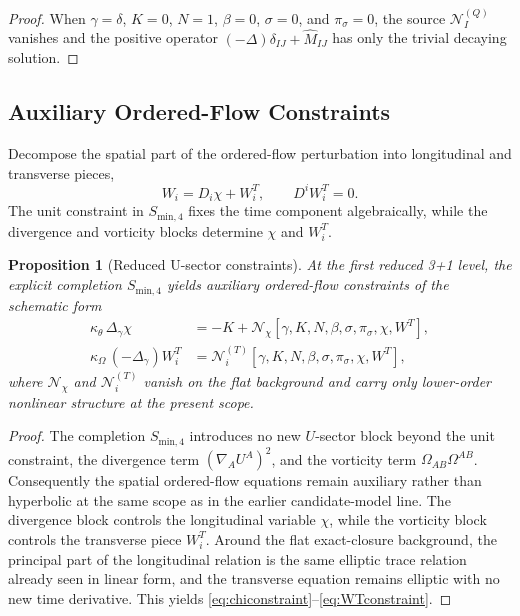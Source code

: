 \documentclass[11pt]{article}
\newtheorem{proposition}{Proposition}
\begin{document}
\begin{proof}
When \(\gamma=\delta\), \(K=0\), \(N=1\), \(\beta=0\), \(\sigma=0\), and \(\pi_\sigma=0\), the source \(\mathcal N_I^{(Q)}\) vanishes and the positive operator \((-\Delta)\delta_{IJ}+\widehat M_{IJ}\) has only the trivial decaying solution.
\end{proof}

\subsection{Auxiliary Ordered-Flow Constraints}

Decompose the spatial part of the ordered-flow perturbation into longitudinal and transverse pieces,
\begin{equation}
W_i=D_i\chi+W_i^T,
\qquad
D^iW_i^T=0.
\label{eq:Wdecomp}
\end{equation}
The unit constraint in \(S_{\mathrm{min},4}\) fixes the time component algebraically, while the divergence and vorticity blocks determine \(\chi\) and \(W_i^T\).

\begin{proposition}[Reduced U-sector constraints]
At the first reduced 3+1 level, the explicit completion \(S_{\mathrm{min},4}\) yields auxiliary ordered-flow constraints of the schematic form
\begin{align}
\kappa_\theta\,\Delta_\gamma \chi
&=
-K + \mathcal N_\chi[\gamma,K,N,\beta,\sigma,\pi_\sigma,\chi,W^T],
\label{eq:chiconstraint}
\\
\kappa_\Omega\,(-\Delta_\gamma)W_i^T
&=
\mathcal N_i^{(T)}[\gamma,K,N,\beta,\sigma,\pi_\sigma,\chi,W^T],
\label{eq:WTconstraint}
\end{align}
where \(\mathcal N_\chi\) and \(\mathcal N_i^{(T)}\) vanish on the flat background and carry only lower-order nonlinear structure at the present scope.
\end{proposition}

\begin{proof}
The completion \(S_{\mathrm{min},4}\) introduces no new \(U\)-sector block beyond the unit constraint, the divergence term \((\nabla_AU^A)^2\), and the vorticity term \(\Omega_{AB}\Omega^{AB}\). Consequently the spatial ordered-flow equations remain auxiliary rather than hyperbolic at the same scope as in the earlier candidate-model line. The divergence block controls the longitudinal variable \(\chi\), while the vorticity block controls the transverse piece \(W_i^T\). Around the flat exact-closure background, the principal part of the longitudinal relation is the same elliptic trace relation already seen in linear form, and the transverse equation remains elliptic with no new time derivative. This yields \eqref{eq:chiconstraint}--\eqref{eq:WTconstraint}.
\end{proof}
\end{document}
